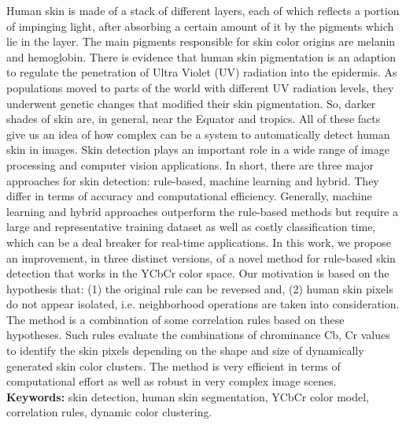 \documentclass[12pt,twoside,a4paper]{book}
\theoremstyle{plain}
\theoremstyle{definition}
\begin{document}
Human skin is made of a stack of different layers, each of which reflects a portion of impinging light, after absorbing a certain amount of it by the pigments which lie in the layer. The main pigments responsible for skin color origins are melanin and hemoglobin. There is evidence that human skin pigmentation is an adaption to regulate the penetration of Ultra Violet (UV) radiation into the epidermis. As populations moved to parts of the world with different UV radiation levels, they underwent genetic changes that modified their skin pigmentation. So, darker shades of skin are, in general, near the Equator and tropics. All of these facts give us an idea of how complex can be a system to automatically detect human skin in images. Skin detection plays an important role in a wide range of image processing and computer vision applications. In short, there are three major approaches for skin detection: rule-based, machine learning and hybrid. They differ in terms of accuracy and computational efficiency. Generally, machine learning and hybrid approaches outperform the rule-based methods but require a large and representative training dataset as well as costly classification time, which can be a deal breaker for real-time applications. In this work, we propose an improvement, in three distinct versions, of a novel method for rule-based skin detection that works in the YCbCr color space. Our motivation is based on the hypothesis that: (1) the original rule can be reversed and, (2) human skin pixels do not appear isolated, i.e. neighborhood operations are taken into consideration. The method is a combination of some correlation rules based on these hypotheses. Such rules evaluate the combinations of chrominance Cb, Cr values to identify the skin pixels depending on the shape and size of dynamically generated skin color clusters. The method is very efficient in terms of computational effort as well as robust in very complex image scenes.
\\

\noindent \textbf{Keywords:} skin detection, human skin segmentation, YCbCr color model, correlation rules, dynamic color clustering.

\tableofcontents    %

\end{document}
